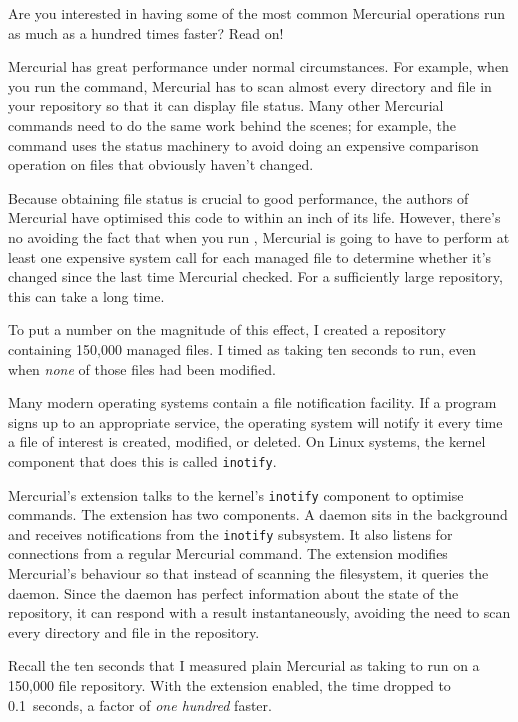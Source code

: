 Are you interested in having some of the most common Mercurial
operations run as much as a hundred times faster?  Read on!

Mercurial has great performance under normal circumstances.  For
example, when you run the  command, Mercurial has to
scan almost every directory and file in your repository so that it can
display file status.  Many other Mercurial commands need to do the
same work behind the scenes; for example, the  command
uses the status machinery to avoid doing an expensive comparison
operation on files that obviously haven't changed.

Because obtaining file status is crucial to good performance, the
authors of Mercurial have optimised this code to within an inch of its
life.  However, there's no avoiding the fact that when you run
, Mercurial is going to have to perform at least one
expensive system call for each managed file to determine whether it's
changed since the last time Mercurial checked.  For a sufficiently
large repository, this can take a long time.

To put a number on the magnitude of this effect, I created a
repository containing 150,000 managed files.  I timed 
as taking ten seconds to run, even when \emph{none} of those files had
been modified.

Many modern operating systems contain a file notification facility.
If a program signs up to an appropriate service, the operating system
will notify it every time a file of interest is created, modified, or
deleted.  On Linux systems, the kernel component that does this is
called \texttt{inotify}.

Mercurial's  extension talks to the kernel's
\texttt{inotify} component to optimise  commands.  The
extension has two components.  A daemon sits in the background and
receives notifications from the \texttt{inotify} subsystem.  It also
listens for connections from a regular Mercurial command.  The
extension modifies Mercurial's behaviour so that instead of scanning
the filesystem, it queries the daemon.  Since the daemon has perfect
information about the state of the repository, it can respond with a
result instantaneously, avoiding the need to scan every directory and
file in the repository.

Recall the ten seconds that I measured plain Mercurial as taking to
run  on a 150,000 file repository.  With the
 extension enabled, the time dropped to 0.1~seconds, a
factor of \emph{one hundred} faster.


